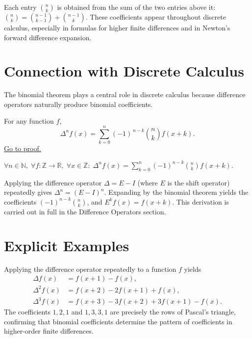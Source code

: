 \begin{remark*}
Each entry \(\binom{n}{k}\) is obtained from the sum of the two entries
above it: \(\binom{n}{k}=\binom{n-1}{k-1}+\binom{n-1}{k}\).
These coefficients appear throughout discrete calculus, especially in
formulas for higher finite differences and in Newton's forward difference
expansion.
\end{remark*}

\section*{Connection with Discrete Calculus}

\begin{remark*}
The binomial theorem plays a central role in discrete calculus because
difference operators naturally produce binomial coefficients.
\end{remark*}

\begin{proposition}
\label{prop:higher-diff-formula}
For any function \(f\),
\[
\Delta^n f(x)
=
\sum_{k=0}^{n} (-1)^{\,n-k}
\binom{n}{k}
f(x+k).
\]
\hyperref[prf:higher-diff-formula]{Go to proof.}
\end{proposition}

\begin{remark*}
\(\forall n \in \mathbb{N},\; \forall f : \mathbb{Z}\to\mathbb{R},\; \forall x \in \mathbb{Z}:\;
\Delta^n f(x) = \displaystyle\sum_{k=0}^{n}(-1)^{n-k}\binom{n}{k}f(x+k)\).
\end{remark*}

\begin{remark*}
Applying the difference operator \(\Delta = E - I\) (where \(E\) is the shift
operator) repeatedly gives \(\Delta^n = (E-I)^n\). Expanding by the binomial
theorem yields the coefficients \((-1)^{n-k}\binom{n}{k}\), and \(E^k f(x) = f(x+k)\).
This derivation is carried out in full in the Difference Operators section.
\end{remark*}

\section*{Explicit Examples}

\begin{remark*}
Applying the difference operator repeatedly to a function \(f\) yields
\[
\begin{aligned}
\Delta f(x) &= f(x+1)-f(x), \\
\Delta^2 f(x) &= f(x+2)-2f(x+1)+f(x), \\
\Delta^3 f(x) &= f(x+3)-3f(x+2)+3f(x+1)-f(x).
\end{aligned}
\]
The coefficients \(1, 2, 1\) and \(1, 3, 3, 1\) are precisely the rows of
Pascal's triangle, confirming that binomial coefficients determine the pattern
of coefficients in higher-order finite differences.
\end{remark*}
